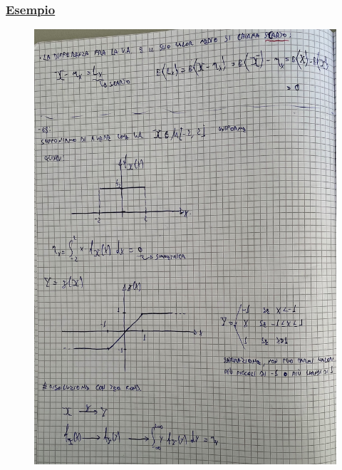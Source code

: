 \documentclass{article}
\begin{document}
\subsubsection{\underline{Esempio}}
\begin{figure}[ht]
\centering
\includegraphics[scale=0.17]{ese/22.jpeg}
\end{figure}
\end{document}
